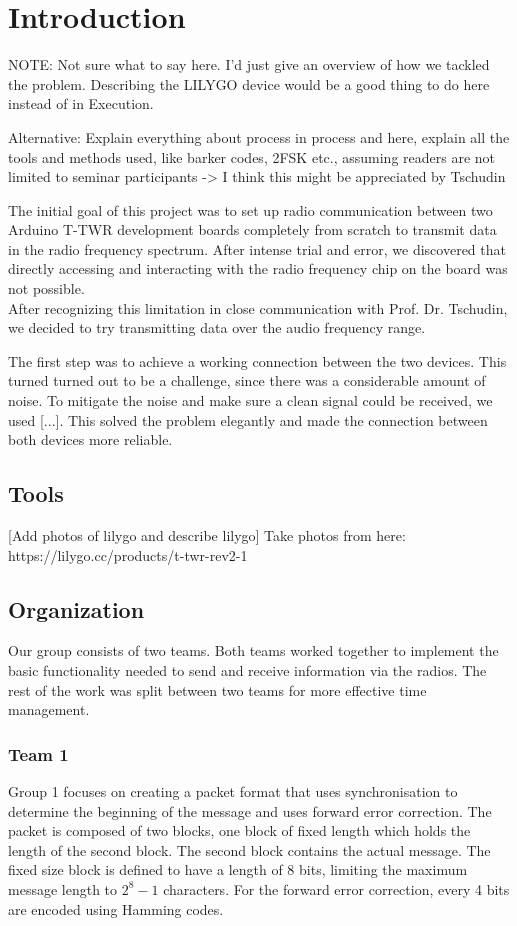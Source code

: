 \chapter{Introduction}
{NOTE: Not sure what to say here. I'd just give an overview of how we tackled the problem.
Describing the LILYGO device would be a good thing to do here instead of in Execution.

Alternative:
Explain everything about process in process and here, explain all the tools and methods used, like barker codes, 2FSK etc., assuming readers are not limited to seminar participants -> I think this might be appreciated by Tschudin}





The initial goal of this project was to set up radio communication between two Arduino T-TWR development boards completely from scratch to transmit data in the radio frequency spectrum. After intense trial and error, we discovered that directly accessing and interacting with the radio frequency chip on the board was not possible.\\

After recognizing this limitation in close communication with Prof. Dr. Tschudin, we decided to try transmitting data over the audio frequency range.

The first step was to achieve a working connection between the two devices. This turned turned out to be a challenge, since there was a considerable amount of noise. To mitigate the noise and make sure a clean signal could be received, we used [...]. This solved the problem elegantly and made the connection between both devices more reliable.

\section{Tools}
[Add photos of lilygo and describe lilygo]
Take photos from here: https://lilygo.cc/products/t-twr-rev2-1

\section{Organization}
Our group consists of two teams. Both teams worked together to implement the basic functionality needed to send and receive information via the radios. The rest of the work was split between two teams for more effective time management.

\subsection{Team 1}
Group 1 focuses on creating a packet format that uses synchronisation to determine the beginning of the message and uses forward error correction. The packet is composed of two blocks, one block of fixed length which holds the length of the second block. The second block contains the actual message. The fixed size block is defined to have a length of 8 bits, limiting the maximum message length to $2^8-1$ characters.
For the forward error correction, every 4 bits are encoded using Hamming codes.
